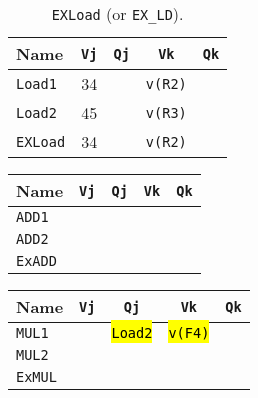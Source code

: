 \begin{enumerate}
    \begin{table}[!htp]
        \centering
        \begin{tabular}{@{} l | c c c c @{}}
            \toprule
            Name            & \texttt{Vj}   & \texttt{Qj}   & \texttt{Vk}           & \texttt{Qk}   \\
            \midrule
            \texttt{Load1}  & 34            &               & \texttt{v(R2)}        &               \\ [.3em]
            \texttt{Load2}  & 45            &               & \texttt{v(R3)}        &               \\
            \cmidrule{1-5}
            \texttt{EXLoad} & 34            &               & \texttt{v(R2)}        &               \\
            \bottomrule
        \end{tabular}
        \caption*{\texttt{EXLoad} (or \texttt{EX\_LD}).}
    \end{table}

    \begin{minipage}[t]{0.45\textwidth}
            \centering
            \begin{tabular}{@{} l | c c c c @{}}
                \toprule
                Name            & \texttt{Vj}   & \texttt{Qj}   & \texttt{Vk}           & \texttt{Qk}   \\
                \midrule
                \texttt{ADD1}   &               &               &                       &               \\ [.3em]
                \texttt{ADD2}   &               &               &                       &               \\
                \cmidrule{1-5}
                \texttt{ExADD}  &               &               &                       &               \\
                \bottomrule
            \end{tabular}
    \end{minipage}
    \hfill
    \begin{minipage}[t]{0.45\textwidth}
            \centering
            \begin{tabular}{@{} l | c c c c @{}}
                \toprule
                Name            & \texttt{Vj}   & \texttt{Qj}           & \texttt{Vk}           & \texttt{Qk}   \\
                \midrule
                \texttt{MUL1}   &               & \hl{\texttt{Load2}}   & \hl{\texttt{v(F4)}}   &               \\ [.3em]
                \texttt{MUL2}   &               &                       &                       &               \\
                \cmidrule{1-5}
                \texttt{ExMUL}  &               &                       &                       &               \\
                \bottomrule
            \end{tabular}
    \end{minipage}


\end{enumerate}
